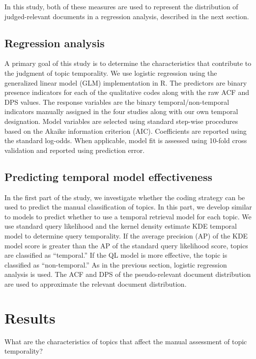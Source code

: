 \documentclass[runningheads,a4paper]{llncs}
\begin{document}
In this study, both of these measures are used to represent the distribution of judged-relevant documents in a regression analysis, described in the next section.

\subsection{Regression analysis}

A primary goal of this study is to determine the characteristics that contribute to the judgment of topic temporality. We use logistic regression using the generalized linear model (GLM) implementation in R. The predictors are binary presence indicators for each of the qualitative codes along with the raw ACF and DPS values.  The response variables are the binary temporal/non-temporal indicators manually assigned in the four studies along with our own temporal designation.  Model variables are selected using standard step-wise procedures based on the Akaike information criterion (AIC). Coefficients are reported using the standard log-odds. When applicable, model fit is assessed using 10-fold cross validation and reported using prediction error.

\subsection{Predicting temporal model effectiveness}
In the first part of the study, we investigate whether the coding strategy can be used to predict the manual classification of topics. In this part, we develop similar to models to predict whether to use a temporal retrieval model for each topic. We use standard query likelihood \cite{XXX} and the kernel density estimate {KDE} temporal model \cite{Efron2014} to determine query temporality. If the average precision (AP) of the KDE model score is greater than the AP of the standard query likelihood score, topics are classified as ``temporal.''  If the QL model is more effective, the topic is classified as ``non-temporal.'' As in the previous section, logistic regression analysis is used. The ACF and DPS of the pseudo-relevant document distribution are used to approximate the relevant document distribution.

\section{Results}

What are the characteristics of topics that affect the manual assessment of topic temporality? 
\end{document}
